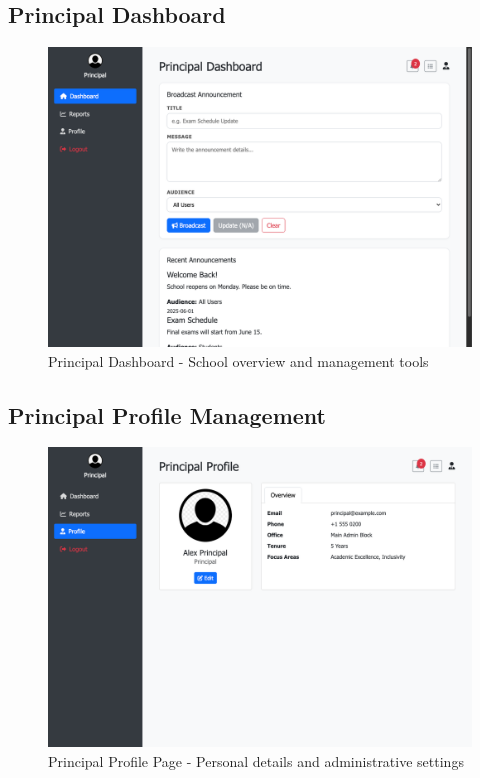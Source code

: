 \documentclass[12pt,a4paper]{article}
\begin{document}
\subsection{Principal Dashboard}
\begin{figure}[H]
    \centering
    \includegraphics[width=\textwidth]{principal/principal-dashboard-page.png}
    \caption{Principal Dashboard - School overview and management tools}
    \label{fig:principal-dashboard}
\end{figure}

\subsection{Principal Profile Management}
\begin{figure}[H]
    \centering
    \includegraphics[width=\textwidth]{principal/principal-profile-page.png}
    \caption{Principal Profile Page - Personal details and administrative settings}
    \label{fig:principal-profile}
\end{figure}
\end{document}
